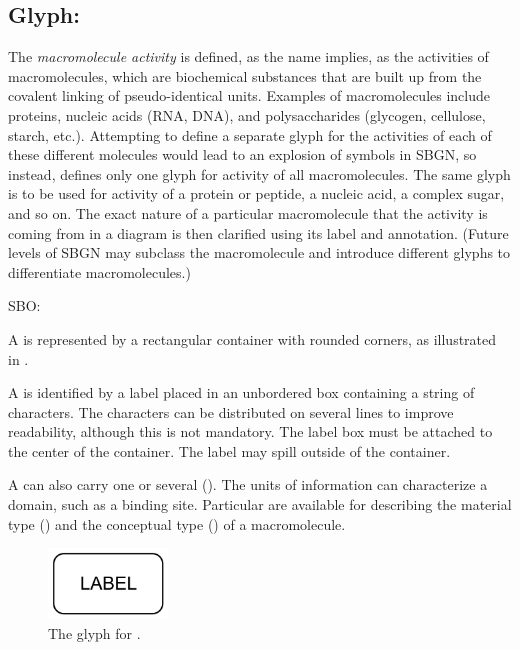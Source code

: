 \subsection{Glyph: }
\label{sec:af:macromolecule}

The \emph{macromolecule activity} is defined, as the name implies, as the activities of macromolecules, which are biochemical substances that are built up from the covalent linking of pseudo-identical units. Examples of macromolecules include proteins, nucleic acids (RNA, DNA), and polysaccharides (glycogen, cellulose, starch, etc.). Attempting to define a separate glyph for the activities of each of these different molecules would lead to an explosion of symbols in SBGN, so instead, \SBGNAFLone defines only one glyph for activity of all macromolecules. The same glyph is to be used for activity of a protein or peptide, a nucleic acid, a complex sugar, and so on. The exact nature of a particular macromolecule that the activity is coming from in a diagram is then clarified using its label and annotation. (Future levels of SBGN may subclass the macromolecule and introduce different glyphs to differentiate macromolecules.)

\begin{glyphDescription}

\glyphSboTerm SBO:

\glyphContainer A  is represented by a rectangular container with rounded corners, as illustrated in .

\glyphLabel A  is identified by a label placed in an unbordered box containing a string of characters.  The characters can be distributed on several lines to improve readability, although this is not mandatory.  The label box must be attached to the center of the container.  The label may spill outside of the container.

A  can also carry one or several  (). The units of information can characterize a domain, such as a binding site.  Particular  are available for describing the material type () and the conceptual type () of a macromolecule.

\end{glyphDescription}

\begin{figure}[H]
  \centering
  \includegraphics[width = 1.25in]{images/macromolecule-plain}
  \caption{The \AF glyph for .}
  \label{fig:af:macromolecule}
\end{figure}
